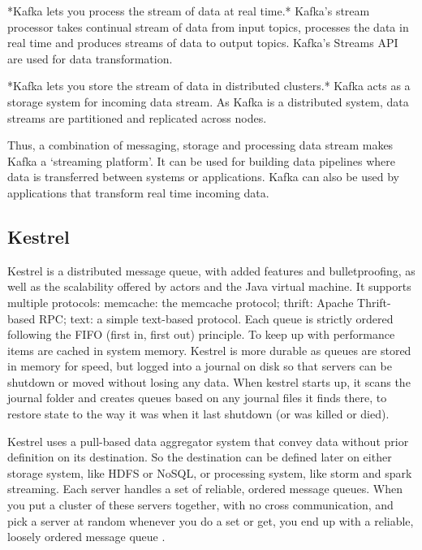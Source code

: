      *Kafka lets you process the stream of data at real time.* Kafka’s
     stream processor takes continual stream of data from input
     topics, processes the data in real time and produces streams of
     data to output topics. Kafka’s Streams API are used for data
     transformation.

     *Kafka lets you store the stream of data in distributed
     clusters.* Kafka acts as a storage system for incoming data
     stream. As Kafka is a distributed system, data streams are
     partitioned and replicated across nodes.

     Thus, a combination of messaging, storage and processing data
     stream makes Kafka a ‘streaming platform’. It can be used for
     building data pipelines where data is transferred between systems
     or applications. Kafka can also be used by applications that
     transform real time incoming data. \cite{www-kafka}

\subsection{Kestrel}
     
     Kestrel is a distributed message queue, with added features and
     bulletproofing, as well as the scalability offered by actors and
     the Java virtual machine. It supports multiple protocols:
     memcache: the memcache protocol; thrift: Apache Thrift-based RPC;
     text: a simple text-based protocol. Each queue is strictly
     ordered following the FIFO (first in, first out) principle. To
     keep up with performance items are cached in system
     memory. Kestrel is more durable as queues are stored in memory
     for speed, but logged into a journal on disk so that servers can
     be shutdown or moved without losing any data. When kestrel starts
     up, it scans the journal folder and creates queues based on any
     journal files it finds there, to restore state to the way it was
     when it last shutdown (or was killed or died).

     Kestrel uses a pull-based data aggregator system that convey data
     without prior definition on its destination. So the destination
     can be defined later on either storage system, like HDFS or
     NoSQL, or processing system, like storm and spark
     streaming. Each server handles a set of reliable, ordered message
     queues. When you put a cluster of these servers together, with no
     cross communication, and pick a server at random whenever you do
     a set or get, you end up with a reliable, loosely ordered message
     queue \cite{git-kestrel}.

